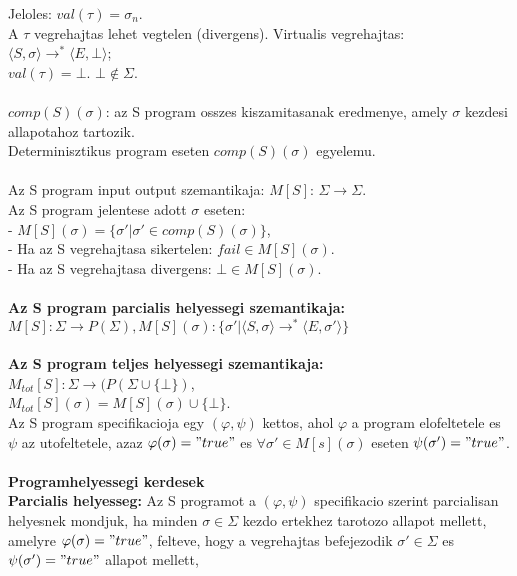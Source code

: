 \documentclass[a4paper,10pt]{article}
\begin{document}
Jeloles: $val(\tau) = \sigma_n$.\\
A $\tau$ vegrehajtas lehet vegtelen (divergens). Virtualis vegrehajtas:\\
$\langle S, \sigma\rangle \to^* \langle E, \bot\rangle$;\\
$val(\tau)=\bot$. $\bot \not\in \Sigma$.\\ \\
$comp(S)(\sigma)$: az S program osszes kiszamitasanak eredmenye, amely $\sigma$ kezdesi allapotahoz tartozik.\\
Determinisztikus program eseten $comp(S)(\sigma)$ egyelemu.\\\\
Az S program input output szemantikaja: $M[S]$: $\Sigma \to \Sigma$.\\
Az S program jelentese adott $\sigma$ eseten:\\
- $M[S](\sigma) = \lbrace\sigma' \vert \sigma' \in comp(S)(\sigma)\rbrace$,\\
- Ha az S vegrehajtasa sikertelen: $fail \in M[S](\sigma)$.\\
- Ha az S vegrehajtasa divergens: $\bot \in M[S](\sigma)$.\\\\
\textbf{Az S program parcialis helyessegi szemantikaja:}\\
$M[S]: \Sigma \to P(\Sigma), M[S](\sigma): \lbrace\sigma' \vert \langle S, \sigma\rangle \to^* \langle E, \sigma'\rangle\rbrace$\\\\
\textbf{Az S program teljes helyessegi szemantikaja:}\\
$M_{tot}[S]:\Sigma \to (P(\Sigma \cup \lbrace \bot\rbrace)$,\\
$M_{tot}[S](\sigma) = M[S](\sigma) \cup \lbrace \bot\rbrace$.\\
Az S program specifikacioja egy $(\varphi, \psi)$ kettos, ahol $\varphi$ a program elofeltetele es $\psi$ az utofeltetele, azaz $\varphi(\sigma) = "true"$ es $\forall \sigma'\in M[s](\sigma)$ eseten  $\psi(\sigma')="true"$.\\\\
\textbf{Programhelyessegi kerdesek}\\
\textbf{Parcialis helyesseg:} Az S programot a $(\varphi, \psi)$ specifikacio szerint parcialisan helyesnek mondjuk, ha minden $\sigma \in \Sigma$ kezdo ertekhez tarotozo allapot mellett, amelyre $\varphi(\sigma) = "true"$, felteve, hogy a vegrehajtas befejezodik $\sigma' \in \Sigma$ es $\psi(\sigma')="true"$ allapot mellett,\\
\end{document}
